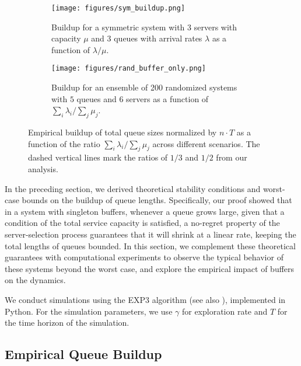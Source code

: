 \begin{figure*}[ht]
    \centering
    \begin{subfigure}{.44\textwidth}
        \texttt{[image: figures/sym\_buildup.png]} %
        \caption{Buildup for a symmetric system with 3 servers with capacity $\mu$ and 3 queues with arrival rates $\lambda$ as a function of $\lambda/\mu$.}
        \label{fig:fig1a-buildup-vs-capacity-ratio-symmentric}
    \end{subfigure}
    \hfill
    \begin{subfigure}{.44\textwidth}
        \texttt{[image: figures/rand\_buffer\_only.png]} %
        \caption{Buildup for an ensemble of 200 randomized systems with $5$ queues and $6$ servers as a function of $\sum_i \lambda_i/\sum_j \mu_j$.}
        \label{fig:fig1b-buildup-vs-capacity-ratio-non-symmentric}
    \end{subfigure}
    \caption{Empirical buildup of total queue sizes normalized by $n \cdot T$ as a function of the ratio $\sum_i \lambda_i/\sum_j \mu_j$ across different scenarios. The dashed vertical lines mark the ratios of $1/3$ and $1/2$ from our analysis.}
    \label{fig:fig1-buildup-vs-capacity-ratio}
\end{figure*}

In the preceding section, we derived theoretical stability conditions and worst-case bounds on the buildup of queue lengths. Specifically, our proof showed that in a system with singleton buffers, whenever a queue grows large, given that a condition of the total service capacity is satisfied, a no-regret property of the server-selection process guarantees that it will shrink at a linear rate, keeping the total lengths of queues bounded. In this section, we complement these theoretical guarantees with computational experiments to observe the typical behavior of these systems beyond the worst case, and explore the empirical impact of buffers on the dynamics.

We conduct simulations using the EXP3 algorithm \cite{auer2002nonstochastic} (see also \cite{slivkins2019introduction}), implemented in Python. For the simulation parameters, we use $\gamma$ for exploration rate and $T$ for the time horizon of the simulation. 

\subsection{Empirical Queue Buildup}

